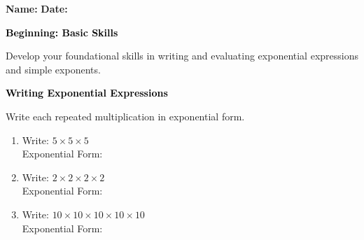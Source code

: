 \documentclass[12pt, letterpaper, fleqn]{article}
\newcommand{\blanklong}{\underline{\hspace{6.5cm}}}
\begin{document}
\textbf{Name:} \underline{\hspace{5cm}}
\hfill
\textbf{Date:} \underline{\hspace{3cm}}\\

\begin{tcolorbox}[colback=black!10]
    \large\textcolor{black}{\textbf{Beginning: Basic Skills}}
\end{tcolorbox}

\vspace{3mm}
\noindent
Develop your foundational skills in writing and evaluating exponential expressions and simple exponents.

\vspace{4mm}

\begin{tcolorbox}[colback=black!10]
\large\textcolor{black}{\textbf{Writing Exponential Expressions}}
\end{tcolorbox}

\noindent
Write each repeated multiplication in exponential form.

\vspace{3mm}

\begin{enumerate}[itemsep=2.2cm, leftmargin=0.6cm]

\item Write: $5 \times 5 \times 5$ \\
Exponential Form: \blanklong

\vspace{2cm}

\item Write: $2 \times 2 \times 2 \times 2$ \\
Exponential Form: \blanklong

\vspace{2cm}

\item Write: $10 \times 10 \times 10 \times 10 \times 10$ \\
Exponential Form: \blanklong

\vspace{2cm}

\end{enumerate}
\end{document}
